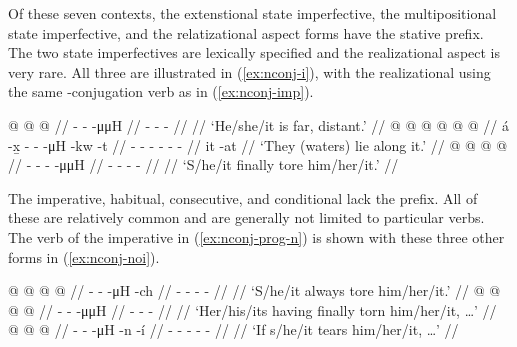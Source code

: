 \begin{multicols}{2}
Of these seven contexts, the extenstional state imperfective, the multipositional state imperfective, and the relatizational aspect forms have the  stative prefix.
The two state imperfectives are lexically specified and the realizational aspect is very rare.
All three are illustrated in (\ref{ex:nconj-i}), with the realizational using the same -conjugation verb as in (\ref{ex:nconj-imp}).

\pex\label{ex:nconj-i}%
\a\label{ex:nconj-i-extstate}%
%
\begingl
	\gla	{} @ {} @ {} @ {} //
	\glb	{}- -  -μμH //
	\glc	{}- -  - //
	\gld	{} {} {} {} //
	\glft	‘He/she/it is far, distant.’
		//
\endgl
\a\label{ex:nconj-i-mposstate}%
%
\begingl
	\gla	{} @ {}  @ {} @ {} @ {} @ {} @ {} //
	\glb	á -x̱ - -  -μH -kw -t //
	\glc	{} - - -  - -\xx{rep} - //
	\gld	it -at  {} {} {} {} {} //
	\glft	‘They (waters) lie along it.’
		//
\endgl
\a\label{ex:nconj-i-realizational}%
%
\begingl
	\gla	{} @ {} @ {} @ {} @ {} //
	\glb	{}- - -  -μμH //
	\glc	{}- - -  -\xx{var} //
	\gld	{} {} {} {} {} //
	\glft	‘S/he/it finally tore him/her/it.’
		//
\endgl
\xe

The imperative, habitual, consecutive, and conditional lack the  prefix.
All of these are relatively common and are generally not limited to particular verbs.
The verb of the imperative in (\ref{ex:nconj-prog-n}) is shown with these three other forms in (\ref{ex:nconj-noi}).

\pex\label{ex:nconj-noi}%
\a\label{ex:nconj-noi-habitual}%
%
\begingl
	\gla	{} @ {} @ {} @ {} @ {} //
	\glb	{}- -  -μH -ch //
	\glc	{}- -  - - //
	\gld	{} {} {} {} {} //
	\glft	‘S/he/it always tore him/her/it.’
		//
\endgl
\a\label{ex:nconj-noi-consecutive}%
%
\begingl
	\gla	{} @ {} @ {} @ {} @ {} //
	\glb	{}- -  -μμH {} //
	\glc	{}- -  -  //
	\gld	{} {} {} {} {} //
	\glft	‘Her/his/its having finally torn him/her/it, …’
		//
\endgl
\a\label{ex:nconj-noi-conditional}%
%
\begingl
	\gla	{} @ {} @ {} @ {} //
	\glb	{}- -  -μH -n -í //
	\glc	{}- -  - - - //
	\gld	{} {} {} {} //
	\glft	‘If s/he/it tears him/her/it, …’
		//
\endgl
\xe


\end{multicols}
